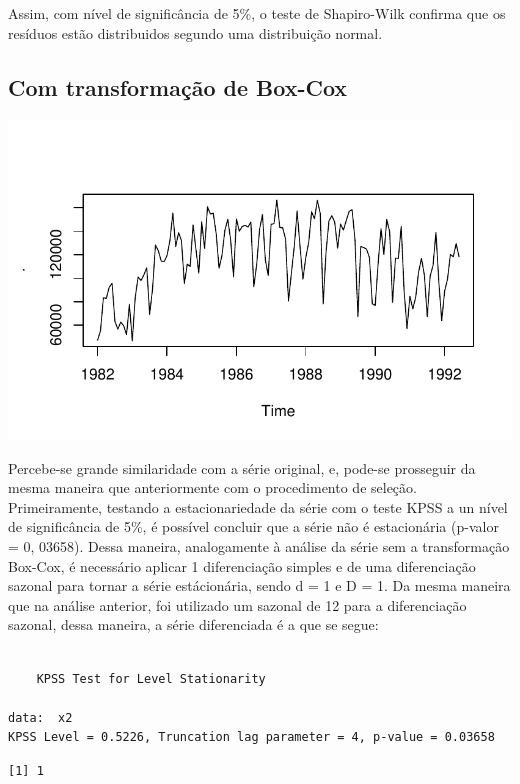 \documentclass[
  letterpaper,
  DIV=11,
  numbers=noendperiod]{scrartcl}
\begin{document}
Assim, com nível de significância de 5\%, o teste de Shapiro-Wilk
confirma que os resíduos estão distribuidos segundo uma distribuição
normal.

\hypertarget{com-transformauxe7uxe3o-de-box-cox}{%
\subsection{Com transformação de
Box-Cox}\label{com-transformauxe7uxe3o-de-box-cox}}

\includegraphics{T2_grupo10_files/figure-pdf/unnamed-chunk-3-1.pdf}

Percebe-se grande similaridade com a série original, e, pode-se
prosseguir da mesma maneira que anteriormente com o procedimento de
seleção. Primeiramente, testando a estacionariedade da série com o teste
KPSS a un nível de significância de 5\%, é possível concluir que a série
não é estacionária (p-valor = 0, 03658). Dessa maneira, analogamente à
análise da série sem a transformação Box-Cox, é necessário aplicar 1
diferenciação simples e de uma diferenciação sazonal para tornar a série
estácionária, sendo d = 1 e D = 1. Da mesma maneira que na análise
anterior, foi utilizado um sazonal de 12 para a diferenciação sazonal,
dessa maneira, a série diferenciada é a que se segue:

\begin{verbatim}

    KPSS Test for Level Stationarity

data:  x2
KPSS Level = 0.5226, Truncation lag parameter = 4, p-value = 0.03658
\end{verbatim}

\begin{verbatim}
[1] 1
\end{verbatim}
\end{document}
